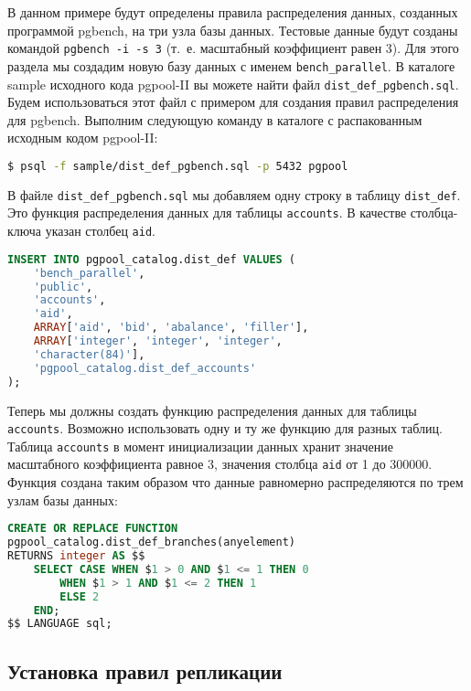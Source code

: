 В данном примере будут определены правила распределения данных, созданных программой pgbench, на три узла базы данных. Тестовые данные будут созданы командой \lstinline!pgbench -i -s 3! (т.~е. масштабный коэффициент равен 3). Для этого раздела мы создадим новую базу данных с именем \lstinline!bench_parallel!. В каталоге sample исходного кода pgpool-II вы можете найти файл \lstinline!dist_def_pgbench.sql!. Будем использоваться этот файл с примером для создания правил распределения для pgbench. Выполним следующую команду в каталоге с распакованным исходным кодом pgpool-II:

\begin{lstlisting}[language=Bash,label=lst:pgpool32,caption=Установка правил распределения данных]
$ psql -f sample/dist_def_pgbench.sql -p 5432 pgpool
\end{lstlisting}

В файле \lstinline!dist_def_pgbench.sql! мы добавляем одну строку в таблицу \lstinline!dist_def!. Это функция распределения данных для таблицы \lstinline!accounts!. В качестве столбца-ключа указан столбец \lstinline!aid!.

\begin{lstlisting}[language=SQL,label=lst:pgpool33,caption=Установка правил распределения данных]
INSERT INTO pgpool_catalog.dist_def VALUES (
    'bench_parallel',
    'public',
    'accounts',
    'aid',
    ARRAY['aid', 'bid', 'abalance', 'filler'],
    ARRAY['integer', 'integer', 'integer',
    'character(84)'],
    'pgpool_catalog.dist_def_accounts'
);
\end{lstlisting}

Теперь мы должны создать функцию распределения данных для таблицы \lstinline!accounts!. Возможно использовать одну и ту же функцию для разных таблиц. Таблица \lstinline!accounts! в момент инициализации данных хранит значение масштабного коэффициента равное 3, значения столбца \lstinline!aid! от 1 до 300000. Функция создана таким образом что данные равномерно распределяются по трем узлам базы данных:

\begin{lstlisting}[language=SQL,label=lst:pgpool34,caption=Установка правил распределения данных]
CREATE OR REPLACE FUNCTION
pgpool_catalog.dist_def_branches(anyelement)
RETURNS integer AS $$
    SELECT CASE WHEN $1 > 0 AND $1 <= 1 THEN 0
        WHEN $1 > 1 AND $1 <= 2 THEN 1
        ELSE 2
    END;
$$ LANGUAGE sql;
\end{lstlisting}


\subsection{Установка правил репликации}

